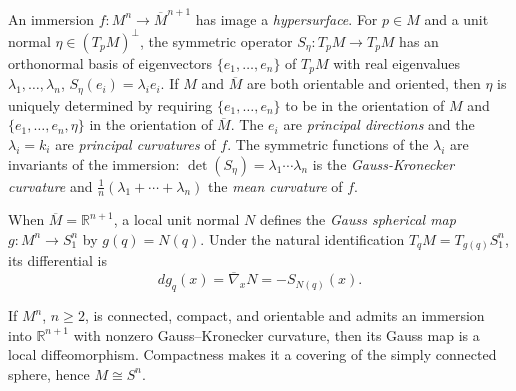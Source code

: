 \begin{example}
  \label{ex:dc-ch6-2-4}
  \leanok
  An immersion $f:M^n\to\overline{M}^{n+1}$ has image a \emph{hypersurface}.
  For $p\in M$ and a unit normal $\eta\in(T_pM)^\perp$, the symmetric operator
  $S_\eta:T_pM\to T_pM$ has an orthonormal basis of
  eigenvectors $\{e_1,\dots,e_n\}$ of $T_pM$ with real eigenvalues
  $\lambda_1,\dots,\lambda_n$, $S_\eta(e_i)=\lambda_i e_i$. If $M$ and $\overline{M}$
  are both orientable and oriented, then $\eta$ is uniquely determined by requiring
  $\{e_1,\dots,e_n\}$ to be in the orientation of $M$ and $\{e_1,\dots,e_n,\eta\}$ in
  the orientation of $\overline{M}$. The $e_i$ are \emph{principal directions} and the
  $\lambda_i=k_i$ are \emph{principal curvatures} of $f$. The symmetric functions of the
  $\lambda_i$ are invariants of the immersion: $\det(S_\eta)=\lambda_1\cdots\lambda_n$
  is the \emph{Gauss-Kronecker curvature} and
  $\frac{1}{n}(\lambda_1+\cdots+\lambda_n)$ the \emph{mean curvature} of $f$.
  
  When $\overline{M}=\mathbb{R}^{n+1}$, a local unit normal $N$ defines the
  \emph{Gauss spherical map} $g:M^n\to S_1^n$ by $g(q)=N(q)$. Under the natural
  identification $T_qM=T_{g(q)}S_1^n$, its differential is
  $$
  dg_q(x)=\overline{\nabla}_xN=-S_{N(q)}(x).
  $$
\end{example}

\begin{remark}
  \label{rem:dc-ch6-2-4-covering}
  \notready
  If $M^n$, $n\geq2$, is connected, compact, and orientable and admits an
  immersion into $\mathbb R^{n+1}$ with nonzero Gauss--Kronecker curvature,
  then its Gauss map is a local diffeomorphism. Compactness makes it a covering
  of the simply connected sphere, hence $M\cong S^n$.
\end{remark}

